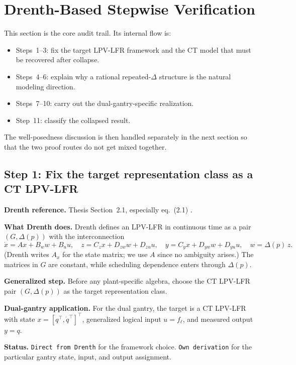 ﻿\documentclass[11pt]{article}
\newcommand{\audititem}[2]{\par\smallskip\noindent\textbf{#1.} #2\par}
\newcommand{\statusline}[1]{\texttt{#1}}
\begin{document}
\section{Drenth-Based Stepwise Verification}

This section is the core audit trail. Its internal flow is:
\begin{itemize}[leftmargin=1.2em]
    \item Steps~1--3: fix the target LPV-LFR framework and the CT model that
    must be recovered after collapse.
    \item Steps~4--6: explain why a rational repeated-$\Delta$ structure is the
    natural modeling direction.
    \item Steps~7--10: carry out the dual-gantry-specific realization.
    \item Step~11: classify the collapsed result.
\end{itemize}
The well-posedness discussion is then handled separately in the next section so
that the two proof routes do not get mixed together.

\subsection{Step 1: Fix the target representation class as a CT LPV-LFR}

\audititem{Drenth reference}{Thesis Section~2.1, especially eq.~(2.1)
\cite{drenth2025thesis}.}

\audititem{What Drenth does}{Drenth defines an LPV-LFR in continuous time as a
pair $(G,\Delta(p))$ with the interconnection
\[
\dot{x} = A x + B_w w + B_u u,\quad
z = C_z x + D_{zw} w + D_{zu} u,\quad
y = C_y x + D_{yw} w + D_{yu} u,\quad
w = \Delta(p)\,z.
\]
(Drenth writes $A_x$ for the state matrix; we use $A$ since no ambiguity arises.)
The matrices in $G$ are constant, while scheduling dependence enters through
$\Delta(p)$.}

\audititem{Generalized step}{Before any plant-specific algebra, choose the CT
LPV-LFR pair $(G,\Delta(p))$ as the target representation class.}

\audititem{Dual-gantry application}{For the dual gantry, the target is a CT
LPV-LFR with state $x = [q^\top,\dot{q}^\top]^\top$, generalized logical input
$u = f_\ell$, and measured output $y = q$.}

\audititem{Status}{\statusline{Direct from Drenth} for the framework choice.
\statusline{Own derivation} for the particular gantry state, input, and output
assignment.}
\end{document}
